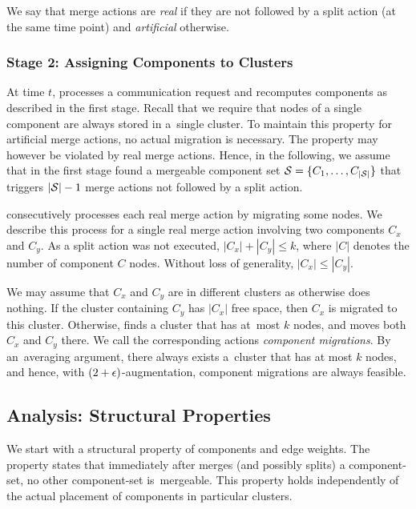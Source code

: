 We say that merge actions are \emph{real} if they are not followed
by a split action (at the same time point) and \emph{artificial} otherwise. 



\subsubsection{Stage 2: Assigning Components to Clusters}

At time $t$, \CREP processes a communication request and recomputes components
as described in the first stage. Recall that we require that nodes of a single
component are always stored in a~single cluster. To maintain this property for
artificial merge actions, no actual migration is necessary. The property may
however be violated by real merge actions. Hence, in the following, we assume
that in the first stage \CREP found a mergeable component set $\mathcal{S} = \{ C_1, 
\ldots, C_{|\mathcal{S}|} \}$ that triggers $|\mathcal{S}|-1$ merge actions not 
followed by a split action.

\CREP consecutively processes each real merge action by migrating some nodes.
We describe this process for a single real merge action involving two
components $C_x$ and $C_y$. As a split action was not executed, $|C_x| +
|C_y| \leq k$, where $|C|$ denotes the number of component $C$ nodes.
Without loss of generality, $|C_x| \leq |C_y|$.

We may assume that $C_x$ and $C_y$ are in different clusters as otherwise
\CREP does nothing. If the cluster containing $C_y$ has $|C_x|$ free space,
then $C_x$ is migrated to this cluster. Otherwise, \CREP finds a cluster that
has at~most $k$ nodes, and moves both $C_x$ and $C_y$ there. We call the
corresponding actions \emph{component migrations}. By an~averaging argument,
there always exists a~cluster that has at most $k$ nodes, and hence, with
$(2+\epsilon)$-augmentation, component migrations are always feasible.


\subsection{Analysis: Structural Properties}

We start with a structural property of components and edge weights.
The property states that immediately after \CREP merges (and
possibly splits) a component-set, no other component-set is~mergeable. This
property holds independently of the actual placement of components in
particular clusters.

